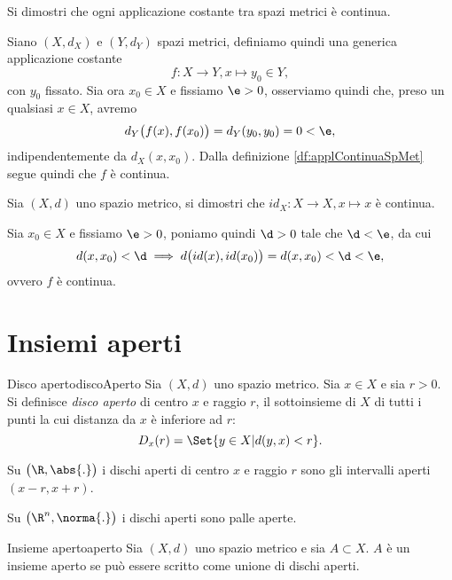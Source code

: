 \begin{exe}
    Si dimostri che ogni applicazione costante tra spazi metrici è continua.
\end{exe}

\begin{sol}
    Siano $(X,d_X)$ e $(Y,d_Y)$ spazi metrici, definiamo quindi una generica applicazione costante
    \[
        f\colon X\to Y,x\mapsto y_0\in Y,
    \]
    con $y_0$ fissato.
    Sia ora $x_0\in X$ e fissiamo $\e >0$, osserviamo quindi che, preso un qualsiasi $x\in X$, avremo
    \[
        d_Y\big(f(x),f(x_0)\big)=d_Y(y_0,y_0)=0<\e,
    \]
    indipendentemente da $d_X(x,x_0)$.
    Dalla definizione \ref{df:applContinuaSpMet} segue quindi che $f$ è continua.
\end{sol}

\begin{exe}
    Sia $(X,d)$ uno spazio metrico, si dimostri che $id_X\colon X\to X,x\mapsto x$ è continua.
\end{exe}

\begin{sol}
    Sia $x_0\in X$ e fissiamo $\e >0$, poniamo quindi $\d>0$ tale che $\d < \e$, da cui
    \[
        d(x,x_0)<\d\implies d\big(id(x),id(x_0)\big)=d(x,x_0)<\d<\e,
    \]
    ovvero $f$ è continua.
\end{sol}
\section{Insiemi aperti}

\begin{defn}{Disco aperto}{discoAperto}
    Sia $(X,d)$ uno spazio metrico. Sia $x\in X$ e sia $r>0$.
    Si definisce \emph{disco aperto} di centro $x$ e raggio $r$, il sottoinsieme di $X$ di tutti i punti la cui distanza da $x$ è inferiore ad $r$:
    \[
        D_x(r)=\Set{y\in X | d(y,x)<r}.
    \]
\end{defn}

\begin{ese}
    Su $\big(\R,\abs{.}\big)$ i dischi aperti di centro $x$ e raggio $r$ sono gli intervalli aperti $(x-r,x+r)$.
\end{ese}

\begin{ese}
    Su $\big(\R^n,\norma{.}\big)$ i dischi aperti sono palle aperte.
\end{ese}

\begin{defn}{Insieme aperto}{aperto}
    Sia $(X,d)$ uno spazio metrico e sia $A\subset X$.
    $A$ è un insieme aperto se può essere scritto come unione di dischi aperti.
\end{defn}

